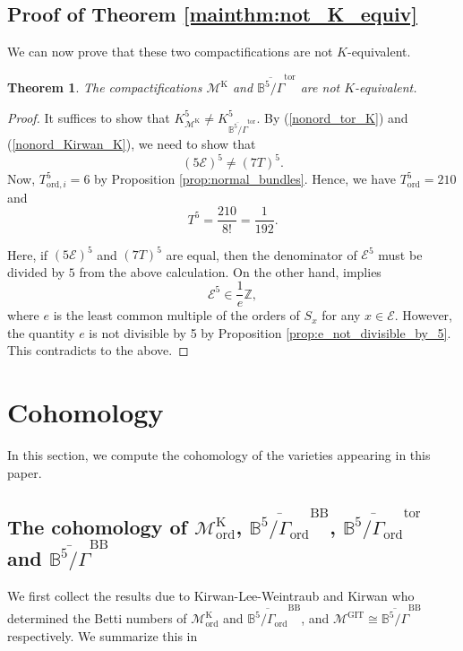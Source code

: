 \documentclass[12pt, pdftex]{amsart}
\theoremstyle{plain}
\newtheorem{thm}{Theorem}[section]
\theoremstyle{definition}
\numberwithin{equation}{section}
\def\Z{{\mathbb Z}}
\def\B{{\mathbb B}}
\def\ord{\mathrm{ord}}
\def\GIT{\mathrm{GIT}}
\def\K{\mathrm{K}}
\def\tor{\mathrm{tor}}
\def\BB{\mathrm{BB}}
\def\E{\mathscr{E}}
\def\M{\mathcal{M}}
\begin{document}
\subsection{Proof of Theorem \ref{mainthm:not_K_equiv}}

We can now prove that these two compactifications are not $K$-equivalent.
\begin{thm}
\label{thm:not_K_equiv}
The compactifications $\M^{\K}$ and $\overline{\B^5/\Gamma}^{\tor}$ are not $K$-equivalent.
\end{thm}
\begin{proof}
It suffices to show that $K_{\M^{\K}}^5\neq K_{\overline{\B^5/\Gamma}^{\tor}}^5$.
By (\ref{nonord_tor_K}) and (\ref{nonord_Kirwan_K}), we need to show that
\[(5\E)^5\neq (7T)^5.\]
Now, $T_{\ord,i}^5=6$ by Proposition \ref{prop:normal_bundles}.
Hence, we have $T_{\ord}^5=210$ and
    \[T^5=\frac{210}{8!}=\frac{1}{192}.\]

Here, if $(5\E)^5$ and $(7T)^5$ are equal, then the denominator of $\E^5$ must be divided by $5$ from the above calculation.
On the other hand, \cite[Proposition 6.10]{CMGHL22} implies 
\[\E^5\in\frac{1}{e}\Z,\]
where $e$ is the least common multiple of the orders of $S_x$ for any $x\in\E$.
However, the quantity $e$ is not divisible by 5 by Proposition \ref{prop:e_not_divisible_by_5}.
This contradicts to the above.
\end{proof}


\section{Cohomology}\label{sec:Bettinumbers}
In this section, we compute the cohomology of the varieties appearing in this paper.

\subsection{The cohomology of $\M_{\ord}^{\K}$,  $\overline{\B^5/\Gamma_{\ord}}^{\BB}$, $\overline{\B^5/\Gamma_{\ord}}^{\tor}$ and $\overline{\B^5/\Gamma}^{\BB}$}
We first collect the results due to Kirwan-Lee-Weintraub \cite{KLW87} and Kirwan \cite{Ki89}
who determined the Betti numbers of $\M_{\ord}^{\K}$ and $\overline{\B^5/\Gamma_{\ord}}^{\BB}$,  
and $\M^{\GIT}\cong \overline{\B^5/\Gamma}^{\BB}$ respectively. We summarize this in
\end{document}
